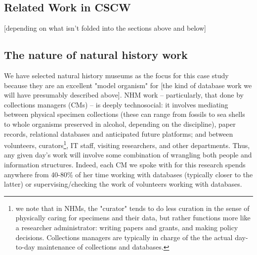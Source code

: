 \subsection{Related Work in CSCW}

[depending on what isn't folded into the sections above and below]

\subsection{The nature of natural history work}

We have selected natural history museums as the focus for this case study because they are an excellent "model organism" for [the kind of database work we will have presumably described above]. NHM work -- particularly, that done by collections managers (CMs) -- is deeply technosocial: it involves mediating between physical specimen collections (these can range from fossils to sea shells to whole organisms preserved in alcohol, depending on the discipline), paper records, relational databases and anticipated future platforms; and between volunteers, curators\footnote{we note that in NHMs, the "curator" tends to do less curation in the sense of physically caring for specimens and their data, but rather functions more like a researcher administrator: writing papers and grants, and making policy decisions. Collections managers are typically in charge of the the actual day-to-day maintenance of collections and databases.}, IT staff, visiting researchers, and other departments. Thus, any given day’s work will involve some combination of wrangling both people and information structures. Indeed, each CM we spoke with for this research spends anywhere from 40-80\% of her time working with databases (typically closer to the latter) or supervising/checking the work of volunteers working with databases.

